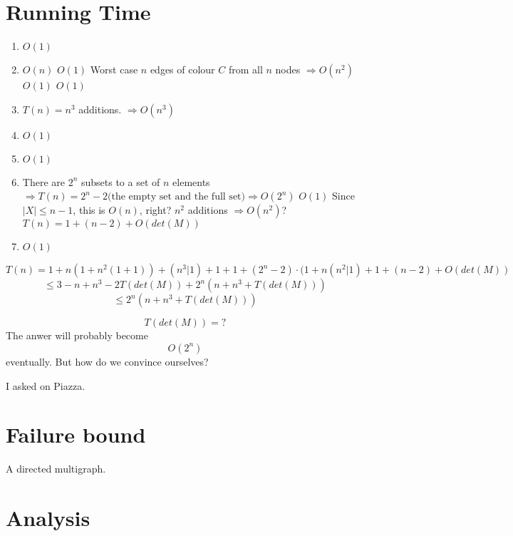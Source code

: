 \documentclass{tufte-handout}
\begin{document}
\section{Running Time}
\begin{enumerate}
\item $O(1)$
\item $O(n)$
\subitem $O(1)$
\subitem Worst case $n$ edges of colour $C$ from all $n$ nodes $\Rightarrow O(n^2)$
\subsubitem $O(1)$
\subsubitem $O(1)$
\item $T(n) = n^3$ additions. $\Rightarrow O(n^3)$
\item $O(1)$
\item $O(1)$
\item There are $2^n$ subsets to a set of $n$ elements $\Rightarrow T(n) = 2^n - 2\text{(the empty set and the full set)} \Rightarrow O(2^n)$
\subitem $O(1)$
\subitem Since $|X| \leq n-1$, this is $O(n)$, right?
\subsubitem $n^2$ additions $\Rightarrow O(n^2)$?
\subitem $T(n) = 1 + (n-2) + O(det(M))$
\item $O(1)$
\end{enumerate}


$$T(n) = 1 + n(1 + n^2(1 + 1)) + (n^3 | 1) + 1 + 1 + (2^n - 2)\cdot(1 + n(n^2 | 1) + 1 + (n - 2) + O(det(M))$$ 
$$ \leq 3 - n + n^3 - 2T(det(M)) + 2^n(n + n^3 + T(det(M)))$$
$$ \leq 2^n(n + n^3 + T(det(M)))$$

$$T(det(M)) = ?$$
The anwer will probably become
$$O(2^n)$$
eventually. But how do we convince ourselves?

I asked on Piazza.

\newpage
\section{Failure bound}



\begin{marginfigure}
\caption{A directed multigraph.}
\end{marginfigure}

\section{Analysis}
\end{document}
